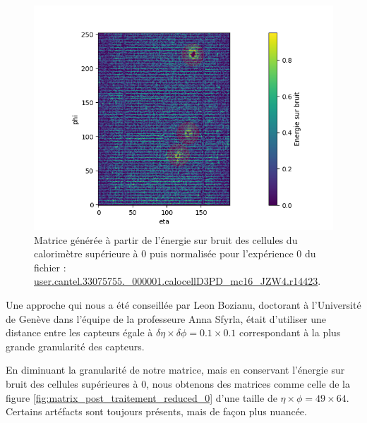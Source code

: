 \begin{figure}[hbt!]
    \centering
    \includegraphics[scale=0.7]{Figures/dataset/matrix_post_traitement_artefacts.png}
    \caption{Matrice générée à partir de l'énergie sur bruit des cellules du calorimètre supérieure à 0 puis normalisée pour l'expérience 0 du fichier : \url{user.cantel.33075755.\_000001.calocellD3PD\_mc16\_JZW4.r14423}.}
    \label{fig:matrix_post_traitement_artefacts}
\end{figure}

\break

Une approche qui nous a été conseillée par Leon Bozianu, doctorant à l'Université de Genève dans l'équipe de la professeure Anna Sfyrla, était d'utiliser une distance entre les capteurs égale à $\delta \eta \times \delta \phi = 0.1 \times 0.1$ correspondant à la plus grande granularité des capteurs.

En diminuant la granularité de notre matrice, mais en conservant l'énergie sur bruit des cellules supérieures à $0$, nous obtenons des matrices comme celle de la figure \ref{fig:matrix_post_traitement_reduced_0} d'une taille de $\eta \times \phi = 49 \times 64$. Certains artéfacts sont toujours présents, mais de façon plus nuancée.

